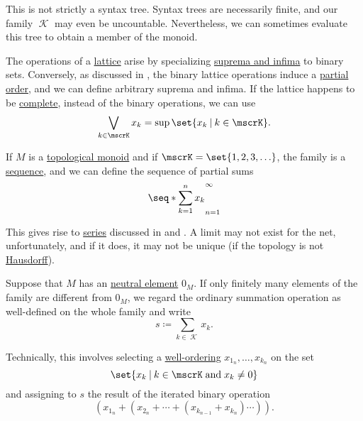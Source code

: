 \begin{remark}
\begin{thmenum}
    This is not strictly a syntax tree. Syntax trees are necessarily finite, and our family \( \mscrK \) may even be uncountable. Nevertheless, we can sometimes evaluate this tree to obtain a member of the monoid.
    \begin{thmenum}
       The operations of a \hyperref[def:semilattice/lattice]{lattice} arise by specializing \hyperref[def:extremal_points/supremum_and_infimum]{suprema and infima} to binary sets. Conversely, as discussed in , the binary lattice operations induce a \hyperref[def:partially_ordered_set]{partial order}, and we can define arbitrary suprema and infima. If the lattice happens to be \hyperref[def:semilattice/complete]{complete}, instead of the binary operations, we can use
      \begin{equation*}
        \bigvee_{k \in \mscrK} x_k = \sup\set{ x_k \given k \in \mscrK }.
      \end{equation*}

       If \( M \) is a \hyperref[rem:topological_first_order_structures]{topological monoid} and if \( \mscrK = \set{ 1, 2, 3, \ldots } \), the family is a \hyperref[def:sequence]{sequence}, and we can define the sequence of partial sums
      \begin{equation*}
        \seq*{ \sum_{k=1}^n x_k }_{n=1}^\infty
      \end{equation*}

      This gives rise to \hyperref[def:convergent_series]{series} discussed in  and . A limit may not exist for the net, unfortunately, and if it does, it may not be unique (if the topology is not \hyperref[def:separation_axioms/T2]{Hausdorff}).

       Suppose that \( M \) has an \hyperref[def:monoid]{neutral element} \( 0_M \). If only finitely many elements of the family are different from \( 0_M \), we regard the ordinary summation operation as well-defined on the whole family and write
      \begin{equation*}
        s \coloneqq \sum_{k \in \mscrK} x_k.
      \end{equation*}

      Technically, this involves selecting a \hyperref[def:well_ordered_set]{well-ordering} \( x_{1_n}, \ldots, x_{k_n} \) on the set
      \begin{equation*}
        \set{ x_k \given k \in \mscrK \T{and} x_k \neq 0 }
      \end{equation*}
      and assigning to \( s \) the result of the iterated binary operation
      \begin{equation*}
        (x_{1_n} + (x_{2_n} + \cdots + (x_{k_{n-1}} + x_{k_n}) \cdots)).
      \end{equation*}


\end{thmenum}
\end{thmenum}
\end{remark}
